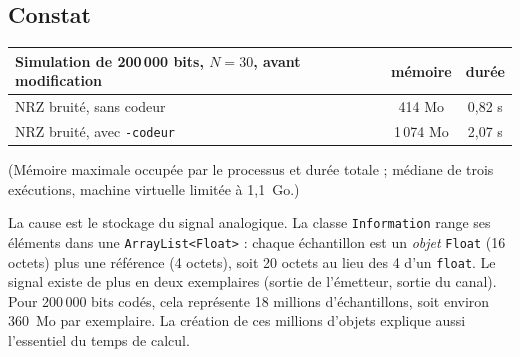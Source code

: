 \documentclass[11pt,a4paper]{article}
\newcommand{\cls}[1]{\texttt{#1}}
\begin{document}
\subsection{Constat}
\begin{center}\begin{tabular}{lcc}\toprule
Simulation de 200\,000 bits, $N = 30$, avant modification & mémoire & durée\\\midrule
NRZ bruité, sans codeur & 414 Mo & 0,82 s\\
NRZ bruité, avec \texttt{-codeur} & 1\,074 Mo & 2,07 s\\\bottomrule
\end{tabular}\end{center}
(Mémoire maximale occupée par le processus et durée totale ; médiane de trois exécutions, machine virtuelle limitée à 1,1~Go.)

La cause est le stockage du signal analogique. La classe \cls{Information} range ses éléments dans une \texttt{ArrayList<Float>} : chaque échantillon est un \emph{objet} \texttt{Float} (16 octets) plus une référence (4 octets), soit 20 octets au lieu des 4 d'un \texttt{float}. Le signal existe de plus en deux exemplaires (sortie de l'émetteur, sortie du canal). Pour 200\,000 bits codés, cela représente 18 millions d'échantillons, soit environ 360~Mo par exemplaire. La création de ces millions d'objets explique aussi l'essentiel du temps de calcul.
\end{document}
